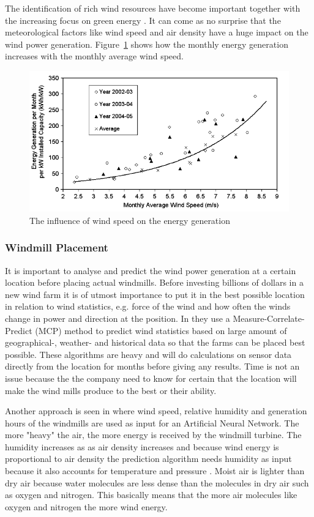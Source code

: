 The identification of rich wind resources have become important together with the increasing focus on green energy \cite{WindPowerGenerationUsingANN}. It can come as no surprise that the meteorological factors like wind speed and air density have a huge impact on the wind power generation. Figure~\ref{fig:energyGeneration} shows how the monthly energy generation increases with the monthly average wind speed. 

\begin{figure}[h!]
\centering
\includegraphics[width=0.8\linewidth,natwidth=898,natheight=587]{billeder/EnergyGenerationVsWindSpeed.png}
\caption{The influence of wind speed on the energy generation \cite{WindPowerGenerationUsingANN}}
\label{fig:energyGeneration}
\end{figure} 

\subsubsection{Windmill Placement}
It is important to analyse and predict the wind power generation at a certain location before placing actual windmills. Before investing billions of dollars in a new wind farm it is of utmost importance to put it in the best possible location in relation to wind statistics, e.g. force of the wind and how often the winds change in power and direction at the position. In \cite{4} they use a Measure-Correlate-Predict (MCP) method to predict wind statistics based on large amount of geographical-, weather- and historical data so that the farms can be placed best possible. These algorithms are heavy and will do calculations on sensor data directly from the location for months before giving any results. Time is not an issue because the the company need to know for certain that the location will make the wind mills produce to the best or their ability.

Another approach is seen in \cite{WindPowerGenerationUsingANN} where wind speed, relative humidity and generation hours of the windmills are used as input for an Artificial Neural Network. The more "heavy" the air, the more energy is received by the windmill turbine. The humidity increases as as air density increases and because wind energy is proportional to air density the prediction algorithm needs humidity as input because it also accounts for temperature and pressure \cite{AirDensityInForecast}. Moist air is lighter than dry air because water molecules are less dense than the molecules in dry air such as oxygen and nitrogen. This basically means that the more air molecules like oxygen and nitrogen the more wind energy.

